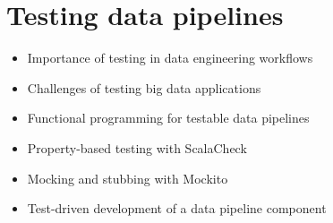 \chapter{ Testing data pipelines }

\begin{itemize}
    \item Importance of testing in data engineering workflows
    \item Challenges of testing big data applications
    \item Functional programming for testable data pipelines
    \item Property-based testing with ScalaCheck
    \item Mocking and stubbing with Mockito
    \item Test-driven development of a data pipeline component
\end{itemize}

